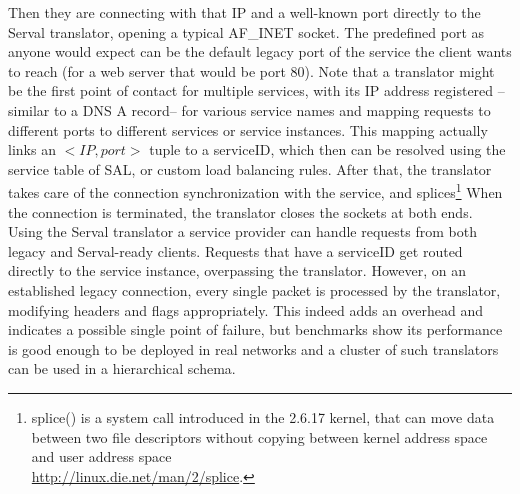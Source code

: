 Then they are connecting with that IP and a well-known port directly to the Serval translator, opening a typical AF\_INET socket.
The predefined port as anyone would expect can be the default legacy port of the service the client wants to reach (for a web server that would be port 80).
Note that a translator might be the first point of contact for multiple services, with its IP address registered --similar to a DNS A record-- for various service names and mapping requests to different ports to different services or service instances.
This mapping actually links an $<IP, port>$ tuple to a serviceID, which then can be resolved using the service table of SAL, or custom load balancing rules. 
After that, the translator takes care of the connection synchronization with the service, and splices\footnote{splice() is a system call introduced in the 2.6.17 kernel, that can move data between two file descriptors without copying between kernel address space and user address space\\ \url{http://linux.die.net/man/2/splice}.}
When the connection is terminated, the translator closes the sockets at both ends.
\\ \indent Using the Serval translator a service provider can handle requests from both legacy and Serval-ready clients.
Requests that have a serviceID get routed directly to the service instance, overpassing the translator.
However, on an established legacy connection, every single packet is processed by the translator, modifying headers and flags appropriately.
This indeed adds an overhead and indicates a possible single point of failure, but benchmarks show its performance is good enough to be deployed in real networks and a cluster of such translators can be used in a hierarchical schema.